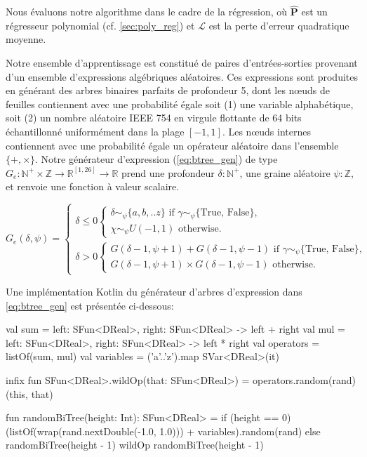 Nous évaluons notre algorithme dans le cadre de la régression, où $\mathbf{\hat P}$ est un régresseur polynomial (cf. \autoref{sec:poly_reg}) et $\mathcal{L}$ est la perte d'erreur quadratique moyenne.

Notre ensemble d'apprentissage est constitué de paires d'entrées-sorties provenant d'un ensemble d'expressions algébriques aléatoires. Ces expressions sont produites en générant des arbres binaires parfaits de profondeur 5, dont les nœuds de feuilles contiennent avec une probabilité égale soit (1) une variable alphabétique, soit (2) un nombre aléatoire IEEE 754 en virgule flottante de 64 bits échantillonné uniformément dans la plage $[-1, 1]$. Les nœuds internes contiennent avec une probabilité égale un opérateur aléatoire dans l'ensemble $\{+, \times\}$. Notre générateur d'expression (\autoref{eq:btree_gen}) de type $G_e: \mathbb{N}^+\times\mathbb{Z} \rightarrow \mathbb{R}^{[1, 26]} \rightarrow \mathbb{R}$ prend une profondeur $\delta: \mathbb{N}^+$, une graine aléatoire $\psi: \mathbb{Z}$, et renvoie une fonction à valeur scalaire.

\begin{equation}\label{eq:btree_gen}
G_e(\delta, \psi) = \begin{cases}
    \delta \leq 0 \begin{cases}
    \delta\sim_\psi\{a,b,..z\} \text{ if } \gamma\sim_\psi\{\text{True, False}\},\\
    \chi\sim_\psi U(-1, 1) \text{ otherwise.}
    \end{cases} \\
    \delta > 0 \begin{cases}
    G(\delta-1, \psi + 1) + G(\delta-1, \psi - 1) \text{ if } \gamma\sim_\psi\{\text{True, False}\},\\
    G(\delta-1, \psi + 1) \times G(\delta-1, \psi - 1) \text{ otherwise.}
    \end{cases}
\end{cases}
\end{equation}

Une implémentation Kotlin du générateur d'arbres d'expression dans \autoref{eq:btree_gen} est présentée ci-dessous:
%
\begin{kotlinlisting}
val sum = { left: SFun<DReal>, right: SFun<DReal> -> left + right }
val mul = { left: SFun<DReal>, right: SFun<DReal> -> left * right }
val operators = listOf(sum, mul)
val variables = ('a'..'z').map { SVar<DReal>(it) }

infix fun SFun<DReal>.wildOp(that: SFun<DReal>) = operators.random(rand)(this, that)

fun randomBiTree(height: Int): SFun<DReal> =
  if (height == 0) (listOf(wrap(rand.nextDouble(-1.0, 1.0))) + variables).random(rand)
  else randomBiTree(height - 1) wildOp randomBiTree(height - 1)
\end{kotlinlisting}

